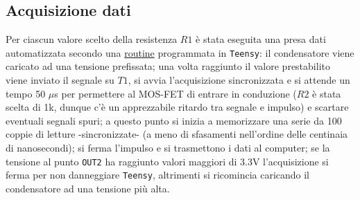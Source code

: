 \documentclass{article}[a4paper, oneside, 11pt]
\begin{document}
\subsection{Acquisizione dati}
Per ciascun valore scelto della resistenza $R1$ è stata eseguita una presa 
dati automatizzata secondo una 
\href{https://github.com/LucaCiucci/relaz_seme/blob/master/sketches/teensy_differenziale_definitivo/teensy_differenziale_definitivo.ino}{routine} programmata 
in \verb+Teensy+: il condensatore viene caricato ad una tensione prefissata;
una volta raggiunto il valore prestabilito viene inviato il segnale su $T1$,
si avvia l'acquisizione sincronizzata e si attende un tempo 50 $\mu$s per
permettere al MOS-FET di entrare in conduzione ($R2$ è stata scelta di 1k,
dunque c'è un apprezzabile ritardo tra segnale e impulso) e scartare eventuali
segnali spuri; a questo punto si inizia a memorizzare una serie da 100 coppie
di letture -sincronizzate- (a meno di sfasamenti nell'ordine delle centinaia di 
nanosecondi); si ferma l'impulso e si trasmettono i dati al computer; se la 
tensione al punto \verb+OUT2+ ha raggiunto valori maggiori di 3.3V 
l'acquisizione si ferma per non danneggiare \verb+Teensy+, altrimenti si
ricomincia caricando il condensatore ad una tensione più alta.

\end{document}
